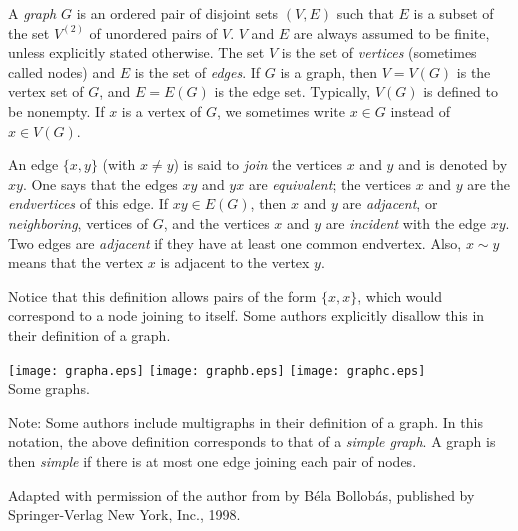 \documentclass[12pt]{article}
\begin{document}
A \emph{graph} $G$ is an ordered pair of disjoint sets $(V, E)$ such that $E$ is a subset of the set $V^{(2)}$ of unordered pairs of $V$. $V$ and $E$ are always assumed to be finite, unless explicitly stated otherwise. The set $V$ is the set of \emph{vertices} (sometimes called nodes) and $E$ is the set of \emph{edges}. If $G$ is a graph, then $V = V(G)$ is the vertex set of $G$, and $E = E(G)$ is the edge set.
Typically, $V(G)$ is defined to be nonempty. If $x$ is a vertex of $G$, we sometimes write $x \in G$ instead of $x \in V(G)$.

An edge $\{x, y\}$ (with $x\neq y$) is said to \emph{join} the vertices $x$ and $y$ and is denoted by $xy$. One says that the edges $xy$ and $yx$ are \emph{equivalent}; the vertices $x$ and $y$ are the \emph{endvertices} of this edge. If $xy \in E(G)$, then $x$ and $y$ are \emph{adjacent}, or \emph{neighboring}, vertices of $G$, and the vertices $x$ and $y$ are \emph{incident} with the edge $xy$. Two edges are \emph{adjacent} if they have at least one common endvertex. Also, $x \sim y$ means that the vertex $x$ is adjacent to the vertex $y$.

Notice that this definition allows pairs of the form $\{x,x\}$, which would correspond to a node joining to itself.  Some authors explicitly disallow this in their definition of a graph.

\begin{center}
\texttt{[image: grapha.eps]} \qquad \qquad
\texttt{[image: graphb.eps]} \qquad \qquad
\texttt{[image: graphc.eps]} \\
Some graphs.
\end{center}

Note:  Some authors include multigraphs in their definition of a graph.  In this notation, the above definition corresponds to that of a \emph{simple graph}.  A graph is then \emph{simple} if there is at most one edge joining each pair of nodes.

\footnotesize{Adapted with permission of the author from \emph{} by B\'{e}la Bollob\'{a}s, published by Springer-Verlag New York, Inc., 1998.}
\end{document}
